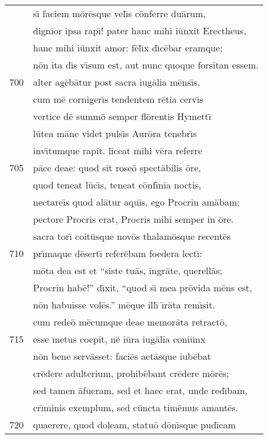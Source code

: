 \documentclass[paper=6in:9in,pagesize=pdftex,
               headinclude=on,footinclude=on,12pt]{scrbook}
\begin{document}
\begin{longtable}[p]{ r l }
 & s\={\i} faciem m\=or\=esque vel\={\i}s c\=onferre du\=arum,\\ 
 & dignior ipsa rap\={\i}! pater hanc mihi i\=unxit Erectheus,\\ 
 & hanc mihi i\=unxit amor: f\=el\={\i}x d\={\i}c\=ebar eramque;\\ 
 & n\=on ita d\={\i}s v\={\i}sum est, aut nunc quoque forsitan essem.\\ 
700 & alter ag\=eb\=atur post sacra iug\=alia m\=ens\={\i}s,\\ 
 & cum m\=e corniger\={\i}s tendentem r\=etia cerv\={\i}s\\ 
 & vertice d\=e summ\=o semper fl\=orentis Hymett\={\i}\\ 
 & l\=utea m\=ane videt puls\={\i}s Aur\=ora tenebr\={\i}s\\ 
 & inv\={\i}tumque rapit. liceat mihi v\=era referre\\ 
705 & p\=ace deae: quod sit rose\=o spect\=abilis \=ore,\\ 
 & quod teneat l\=uc\={\i}s, teneat c\=onf\={\i}nia noctis,\\ 
 & nectare\={\i}s quod al\=atur aqu\={\i}s, ego Procrin am\=abam;\\ 
 & pectore Procris erat, Procris mihi semper in \=ore.\\ 
 & sacra tor\={\i} coit\=usque nov\=os thalam\=osque recent\=es\\ 
710 & pr\={\i}maque d\=esert\={\i} refer\=ebam foedera lect\={\i}:\\ 
 & m\=ota dea est et ``siste tu\=as, ingr\=ate, querell\=as;\\ 
 & Procrin hab\=e!'' d\={\i}xit, ``quod s\={\i} mea pr\=ovida m\=ens est,\\ 
 & n\=on habuisse vol\=es.'' m\=eque ill\={\i} \={\i}r\=ata rem\={\i}sit.\\ 
 & cum rede\=o m\=ecumque deae memor\=ata retract\=o,\\ 
715 & esse metus coepit, n\=e i\=ura iug\=alia coni\=unx\\ 
 & n\=on bene serv\=asset: faci\=es aet\=asque iub\=ebat\\ 
 & cr\=edere adulterium, prohib\=ebant cr\=edere m\=or\=es;\\ 
 & sed tamen \=afueram, sed et haec erat, unde red\={\i}bam,\\ 
 & cr\={\i}minis exemplum, sed c\=uncta tim\=emus amant\=es.\\ 
720 & quaerere, quod doleam, statu\=o d\=on\={\i}sque pud\={\i}cam\\ 

\end{longtable}
\end{document}
